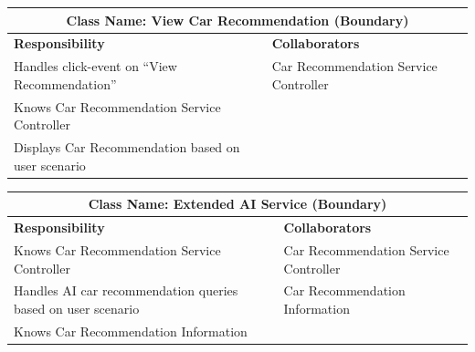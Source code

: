 \documentclass[]{article}
\begin{document}
\begin{table}[H]
  \centering
  \renewcommand{\arraystretch}{1.3} %
  \begin{tabular}{|p{7.5cm}|p{7.5cm}|}
    \hline
    \multicolumn{2}{|c|}{\textbf{Class Name: View Car Recommendation (Boundary)}}              \\
    \hline
    \textbf{Responsibility}                            & \textbf{Collaborators}                \\
    \hline
    Handles click-event on “View Recommendation”       & Car Recommendation Service Controller \\
    Knows Car Recommendation Service Controller        &                                       \\
    Displays Car Recommendation based on user scenario &                                       \\
    \hline
  \end{tabular}
  \label{tab:crc_card}
\end{table}

\begin{table}[H]
  \centering
  \renewcommand{\arraystretch}{1.3} %
  \begin{tabular}{|p{7.5cm}|p{7.5cm}|}
    \hline
    \multicolumn{2}{|c|}{\textbf{Class Name: Extended AI Service (Boundary)}}                            \\
    \hline
    \textbf{Responsibility}                                      & \textbf{Collaborators}                \\
    \hline
    Knows Car Recommendation Service Controller                  & Car Recommendation Service Controller \\
    Handles AI car recommendation queries based on user scenario & Car Recommendation Information        \\
    Knows Car Recommendation Information                         &                                       \\
    \hline
  \end{tabular}
  \label{tab:crc_card}
\end{table}
\end{document}
